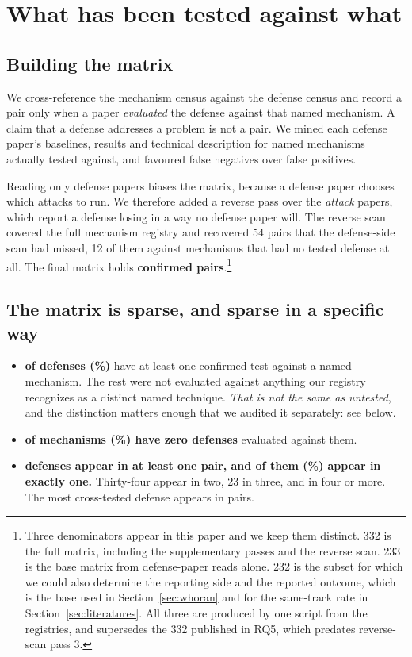 \section{What has been tested against what}
\label{sec:coverage}

\subsection{Building the matrix}

We cross-reference the mechanism census against the defense census and record a
pair only when a paper \emph{evaluated} the defense against that named
mechanism. A claim that a defense addresses a problem is not a pair. We mined
each defense paper's baselines, results and technical description for named
mechanisms actually tested against, and favoured false negatives over false
positives.

Reading only defense papers biases the matrix, because a defense paper chooses
which attacks to run. We therefore added a reverse pass over the \emph{attack}
papers, which report a defense losing in a way no defense paper will. The
reverse scan covered the full mechanism registry and recovered 54 pairs that
the defense-side scan had missed, 12 of them against mechanisms that had no
tested defense at all. The final matrix holds \textbf{\NPairsComposite{}
confirmed pairs}.\footnote{Three denominators appear in this paper and we keep them
distinct. 332 is the full matrix, including the supplementary passes and the
reverse scan. 233 is the base matrix from defense-paper reads alone. 232 is the
subset for which we could also determine the reporting side and the reported
outcome, which is the base used in Section~\ref{sec:whoran} and for the
same-track rate in Section~\ref{sec:literatures}. All three are produced by
one script from the registries, and \NPairsComposite{} supersedes the 332
published in RQ5, which predates reverse-scan pass 3.}

\subsection{The matrix is sparse, and sparse in a specific way}

\begin{itemize}
\item \textbf{\NDefMatchedFull{} of \NDefenses{} defenses
  (\PctDefMatched{}\%)} have at least one confirmed test against a named
  mechanism. The rest were not evaluated against anything our registry
  recognizes as a distinct named technique. \emph{That is not the same as
  untested}, and the distinction matters enough that we audited it
  separately: see below.
\item \textbf{\NMechUncovered{} of \NMechanismsBench{} mechanisms
  (\PctMechUncovered{}\%) have zero defenses} evaluated against them.
\item \textbf{\NDefMatchedFull{} defenses appear in at least one pair, and
  \NDefOneFull{} of them (\PctDefOneFull{}\%) appear in exactly one.}
  Thirty-four appear in two, 23 in three, and \NDefFourPlus{} in four or
  more. The most cross-tested defense appears in \NDefCeiling{} pairs.
\end{itemize}

